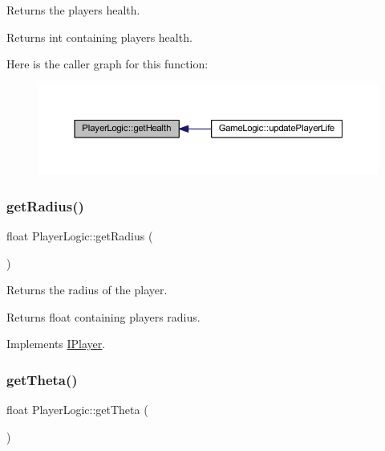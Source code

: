 Returns the players health. 

\begin{DoxyReturn}{Returns}
int containing player\textquotesingle{}s health. 
\end{DoxyReturn}
Here is the caller graph for this function\+:\nopagebreak
\begin{figure}[H]
\begin{center}
\leavevmode
\includegraphics[width=350pt]{class_player_logic_aa13b870627a1d38cd1c633ac8012e5af_icgraph}
\end{center}
\end{figure}
\mbox{\label{class_player_logic_a2ca2c54d1e07bfc40a08b5c55403af3a}} 
\subsubsection{\texorpdfstring{get\+Radius()}{getRadius()}}
{\footnotesize\ttfamily float Player\+Logic\+::get\+Radius (\begin{DoxyParamCaption}{ }\end{DoxyParamCaption})\hspace{0.3cm}{\ttfamily [virtual]}}



Returns the radius of the player. 

\begin{DoxyReturn}{Returns}
float containing players radius. 
\end{DoxyReturn}


Implements \hyperlink{class_i_player_a240460b3baeee74029f1fc407493d121}{I\+Player}.

\mbox{\label{class_player_logic_a7ea2f59ddde028b5451ddbe60453de1c}} 
\subsubsection{\texorpdfstring{get\+Theta()}{getTheta()}}
{\footnotesize\ttfamily float Player\+Logic\+::get\+Theta (\begin{DoxyParamCaption}{ }\end{DoxyParamCaption})\hspace{0.3cm}{\ttfamily [virtual]}}



